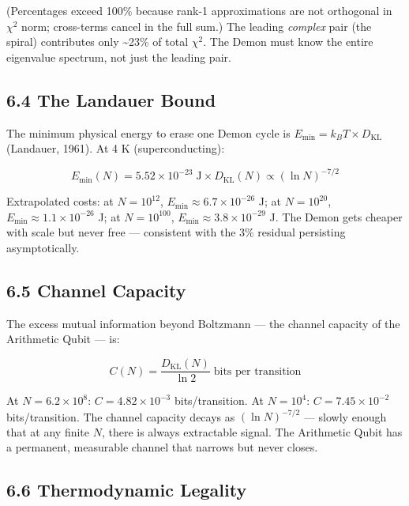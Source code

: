 \documentclass[
  11pt,
]{article}
\numberwithin{equation}{section}
\begin{document}
(Percentages exceed 100\% because rank-1 approximations are not
orthogonal in \(\chi^2\) norm; cross-terms cancel in the full sum.) The
leading \emph{complex} pair (the spiral) contributes only
\textasciitilde23\% of total \(\chi^2\). The Demon must know the entire
eigenvalue spectrum, not just the leading pair.

\subsection{6.4 The Landauer Bound}\label{the-landauer-bound}

The minimum physical energy to erase one Demon cycle is
\(E_{\min} = k_B T \times D_{\text{KL}}\) (Landauer, 1961). At 4 K
(superconducting):

\begin{equation}E_{\min}(N) = 5.52 \times 10^{-23} \;\text{J} \times D_{\text{KL}}(N) \propto (\ln N)^{-7/2}\end{equation}

Extrapolated costs: at \(N = 10^{12}\),
\(E_{\min} \approx 6.7 \times 10^{-26}\) J; at \(N = 10^{20}\),
\(E_{\min} \approx 1.1 \times 10^{-26}\) J; at \(N = 10^{100}\),
\(E_{\min} \approx 3.8 \times 10^{-29}\) J. The Demon gets cheaper with
scale but never free --- consistent with the 3\% residual persisting
asymptotically.

\subsection{6.5 Channel Capacity}\label{channel-capacity}

The excess mutual information beyond Boltzmann --- the channel capacity
of the Arithmetic Qubit --- is:

\begin{equation}C(N) = \frac{D_{\text{KL}}(N)}{\ln 2} \;\text{bits per transition}\end{equation}

At \(N = 6.2 \times 10^8\): \(C = 4.82 \times 10^{-3}\) bits/transition.
At \(N = 10^4\): \(C = 7.45 \times 10^{-2}\) bits/transition. The
channel capacity decays as \((\ln N)^{-7/2}\) --- slowly enough that at
any finite \(N\), there is always extractable signal. The Arithmetic
Qubit has a permanent, measurable channel that narrows but never closes.

\subsection{6.6 Thermodynamic Legality}\label{thermodynamic-legality}
\end{document}
